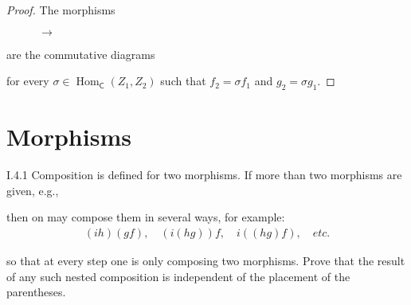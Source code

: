\begin{proof}
	The morphisms
	\begin{figure}[htp]
		\centering
		$\longrightarrow$
	\end{figure}

	are the commutative diagrams
	\begin{figure}[htp]
		\centering
	\end{figure}

	for every $\sigma\in \operatorname{Hom}_{\mathsf{C}}(Z_{1}, Z_{2})$ such that $f_{2} = \sigma f_{1}$ and $g_{2} = \sigma g_{1}$.
\end{proof}

\section{Morphisms}

\begin{exercise}{I.4.1}
	Composition is defined for two morphisms. If more than two morphisms are given, e.g.,

	then on may compose them in several ways, for example:
	\begin{align*}
		(ih)(gf),\quad (i(hg))f,\quad i((hg)f),\quad etc.
	\end{align*}

	so that at every step one is only composing two morphisms. Prove that the result of any such nested composition is independent of the placement of the parentheses.
\end{exercise}

